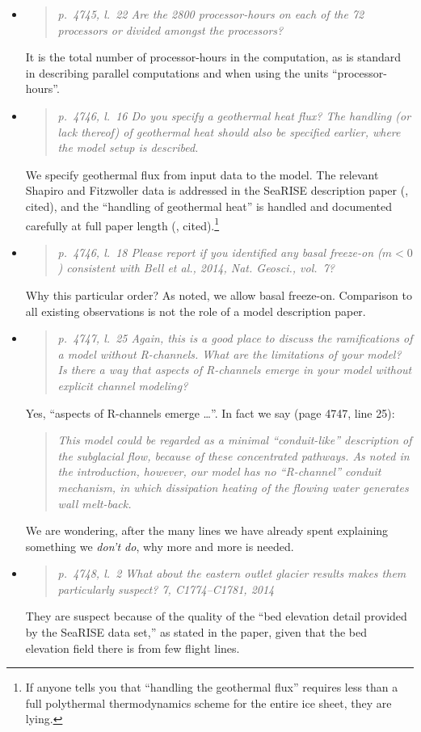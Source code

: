 \documentclass[11pt,reqno]{amsart}
\newcommand{\reply}[2]{
\medskip\medskip
\item  \begin{quote}
\emph{#1}
\end{quote}

\medskip
\noindent #2}
\begin{document}
\begin{itemize}
\reply{p.~4745, l.~22 Are the 2800 processor-hours on each of the 72 processors or divided amongst the processors?}
{It is the total number of processor-hours in the computation, as is standard in describing parallel computations and when using the units ``processor-hours''.}

\reply{p.~4746, l.~16 Do you specify a geothermal heat flux? The handling (or lack thereof) of geothermal heat should also be specified earlier, where the model setup is described.}
{We specify geothermal flux from input data to the model.  The relevant Shapiro and Fitzwoller data is addressed in the SeaRISE description paper (\cite{Bindschadler2013SeaRISE}, cited), and the ``handling of geothermal heat'' is handled and documented carefully at full paper length (\cite{AschwandenBuelerKhroulevBlatter}, cited).\footnote{If anyone tells you that ``handling the geothermal flux'' requires less than a full polythermal thermodynamics scheme for the entire ice sheet, they are lying.}}

\reply{p.~4746, l.~18 Please report if you identified any basal freeze-on ($m < 0$) consistent with Bell et al., 2014, Nat. Geosci., vol.~7?}
{Why this particular order?  As noted, we allow basal freeze-on.  Comparison to all existing observations is not the role of a model description paper.}

\reply{p.~4747, l.~25 Again, this is a good place to discuss the ramifications of a model without R-channels. What are the limitations of your model? Is there a way that aspects of R-channels emerge in your model without explicit channel modeling?}
{Yes, ``aspects of R-channels emerge \dots''.  In fact we say (page 4747, line 25):
\begin{quote}
\emph{This model could be regarded as a minimal ``conduit-like'' description of the subglacial flow, because of these concentrated pathways. As noted in the introduction, however, our model has no ``R-channel'' conduit mechanism, in which dissipation heating of the flowing water generates wall melt-back.}
\end{quote}
We are wondering, after the many lines we have already spent explaining something we \emph{don't do}, why more and more is needed.}

\reply{p.~4748, l.~2 What about the eastern outlet glacier results makes them particularly
suspect? 7, C1774--C1781, 2014}
{They are suspect because of the quality of the ``bed elevation detail provided by the SeaRISE data set,'' as stated in the paper, given that the bed elevation field there is from few flight lines.}


\end{itemize}
\end{document}
